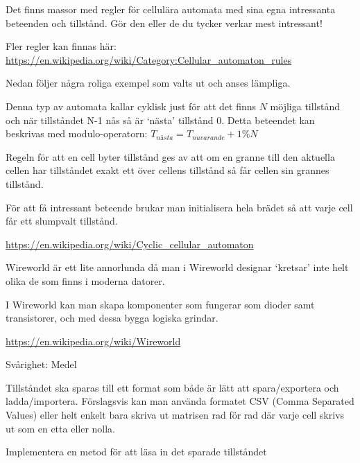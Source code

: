 

    Det finns massor med regler för cellulära automata med sina egna intressanta beteenden och tillstånd.
    Gör den eller de du tycker verkar mest intressant!

    Fler regler kan finnas här: \url{https://en.wikipedia.org/wiki/Category:Cellular_automaton_rules}

    Nedan följer några roliga exempel som valts ut och anses lämpliga.


        Denna typ av automata kallar cyklisk just för att det finns $N$ möjliga tillstånd och när tillståndet N-1 nås så är `nästa' tillstånd $0$.
        Detta beteendet kan beskrivas med modulo-operatorn: $T_{nästa} = T_{nuvarande} + 1 \% N$

        Regeln för att en cell byter tillstånd ges av att om en granne till den aktuella cellen har tillståndet exakt ett över cellens tillstånd så får cellen sin grannes tillstånd.

        För att få intressant beteende brukar man initialisera hela brädet så att varje cell får ett slumpvalt tillstånd.

        \url{https://en.wikipedia.org/wiki/Cyclic_cellular_automaton}


        Wireworld är ett lite annorlunda då man i Wireworld designar `kretsar' inte helt olika de som finns i moderna datorer.

        I Wireworld kan man skapa komponenter som fungerar som dioder samt transistorer, och med dessa bygga logiska grindar.

        \url{https://en.wikipedia.org/wiki/Wireworld}


    Svårighet: Medel

        Tillståndet ska sparas till ett format som både är lätt att spara/exportera och ladda/importera.
        Förslagsvis kan man använda formatet CSV (Comma Separated Values) eller helt enkelt bara skriva
        ut matrisen rad för rad där varje cell skrivs ut som en etta eller nolla.

        Implementera en metod för att läsa in det sparade tillståndet



